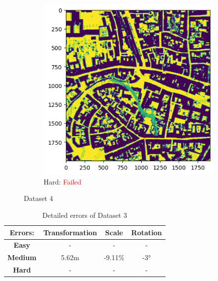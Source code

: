 \documentclass[11pt]{article}
\begin{document}
\begin{figure}[p]
        \vspace{1em}

        \begin{subfigure}{0.45\textwidth}
            \centering
            \includegraphics[width=\linewidth]{images/full/hard/4_0_1_hard}
            \caption{Hard: \textcolor{red}{Failed}}
            \label{fig:4_0_1_hard}
        \end{subfigure}
        \hfill

        \caption{Dataset 4}
        \label{fig:res_4_0_1}
    \end{figure}

    \begin{table}[p]
        \centering
        \begin{tabular}{|c|c|c|c|}
          \hline
          \textbf{Errors:} & \textbf{Transformation} & \textbf{Scale} & \textbf{Rotation} \\
          \hline
          \textbf{Easy}   & -  & - & - \\
          \hline
          \textbf{Medium} & 5.62m  & -9.11\% & -3° \\
          \hline
          \textbf{Hard}   & -  & - & - \\
          \hline
        \end{tabular}
        \caption{Detailed errors of Dataset 3}
        \label{tab:simpletable}
    \end{table}
\end{document}
